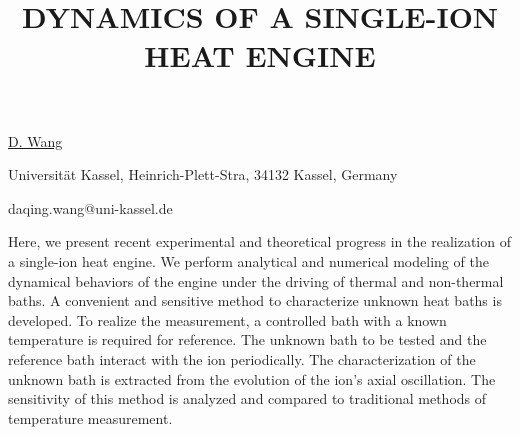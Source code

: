 \title{DYNAMICS OF A SINGLE-ION HEAT ENGINE}

\underline{D. Wang} 

{\normalsize{\vspace{-4mm}
Universit\"at Kassel,
Heinrich-Plett-Stra, 34132 Kassel, Germany



\email daqing.wang@uni-kassel.de}}

Here, we present recent experimental and theoretical progress in the realization of a single-ion heat engine. We perform analytical and numerical modeling of the dynamical behaviors of the engine under the driving of thermal and non-thermal baths. A convenient and sensitive method to characterize unknown heat baths is developed. To realize the measurement, a controlled bath with a known temperature is required for reference. The unknown bath to be tested and the reference bath interact with the ion periodically. The characterization of the unknown bath is extracted from the evolution of the ion’s axial oscillation. The sensitivity of this method is analyzed and compared to traditional methods of temperature measurement.

\vspace{\baselineskip}